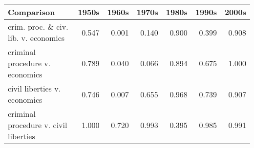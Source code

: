 \begin{tabular}{lrrrrrr}
  \toprule
Comparison & 1950s & 1960s & 1970s & 1980s & 1990s & 2000s \\ 
  \midrule
crim. proc. \& civ. lib. v. economics & 0.547 & 0.001 & 0.140 & 0.900 & 0.399 & 0.908 \\ 
  criminal procedure v. economics & 0.789 & 0.040 & 0.066 & 0.894 & 0.675 & 1.000 \\ 
  civil liberties v. economics & 0.746 & 0.007 & 0.655 & 0.968 & 0.739 & 0.907 \\ 
  criminal procedure v. civil liberties & 1.000 & 0.720 & 0.993 & 0.395 & 0.985 & 0.991 \\ 
   \bottomrule
\end{tabular}
